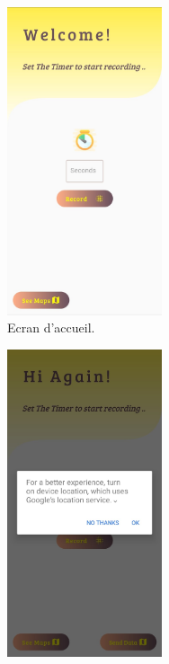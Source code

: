 \begin{figure}[h!]
    \begin{subfigure}{.50\textwidth}
        \center
        \includegraphics[width=0.50\textwidth]{Images/recordingApp/firstScreen.jpg}
        \caption{Ecran d'accueil.}
        \label{fig:Welcome Screen}
    \end{subfigure}
    \begin{subfigure}{.50\textwidth}
        \center
        \includegraphics[width=0.50\textwidth]{Images/recordingApp/askingGps.jpg}

\end{subfigure}
\end{figure}
